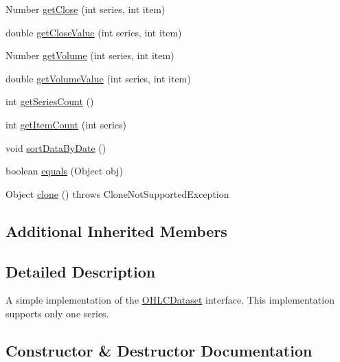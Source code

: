 \begin{DoxyCompactItemize}
\item 
Number \mbox{\hyperlink{classorg_1_1jfree_1_1data_1_1xy_1_1_default_o_h_l_c_dataset_afca93f709f3d421a3d57b67e00357b03}{get\+Close}} (int series, int item)
\item 
double \mbox{\hyperlink{classorg_1_1jfree_1_1data_1_1xy_1_1_default_o_h_l_c_dataset_ae13de67fcd68bf22dd1436d5059212e7}{get\+Close\+Value}} (int series, int item)
\item 
Number \mbox{\hyperlink{classorg_1_1jfree_1_1data_1_1xy_1_1_default_o_h_l_c_dataset_a83b83f0c9bfd31b3b26adc04760cc910}{get\+Volume}} (int series, int item)
\item 
double \mbox{\hyperlink{classorg_1_1jfree_1_1data_1_1xy_1_1_default_o_h_l_c_dataset_ab7daa41ae6b486616cc15c3b90212c15}{get\+Volume\+Value}} (int series, int item)
\item 
int \mbox{\hyperlink{classorg_1_1jfree_1_1data_1_1xy_1_1_default_o_h_l_c_dataset_af43bc16373fd6cef22a4af8f2b6aba60}{get\+Series\+Count}} ()
\item 
int \mbox{\hyperlink{classorg_1_1jfree_1_1data_1_1xy_1_1_default_o_h_l_c_dataset_ac8693287c1a19d1228b14cb9c22f52aa}{get\+Item\+Count}} (int series)
\item 
void \mbox{\hyperlink{classorg_1_1jfree_1_1data_1_1xy_1_1_default_o_h_l_c_dataset_aa3a2a174d89a61db93a432292d541f44}{sort\+Data\+By\+Date}} ()
\item 
boolean \mbox{\hyperlink{classorg_1_1jfree_1_1data_1_1xy_1_1_default_o_h_l_c_dataset_add2f8e277ddac5fb19ff0f3a49122cbc}{equals}} (Object obj)
\item 
Object \mbox{\hyperlink{classorg_1_1jfree_1_1data_1_1xy_1_1_default_o_h_l_c_dataset_a1a79c2747da3aac248beb7f74eadb60f}{clone}} ()  throws Clone\+Not\+Supported\+Exception 
\end{DoxyCompactItemize}
\subsection*{Additional Inherited Members}


\subsection{Detailed Description}
A simple implementation of the \mbox{\hyperlink{interfaceorg_1_1jfree_1_1data_1_1xy_1_1_o_h_l_c_dataset}{O\+H\+L\+C\+Dataset}} interface. This implementation supports only one series. 

\subsection{Constructor \& Destructor Documentation}
\mbox{\label{classorg_1_1jfree_1_1data_1_1xy_1_1_default_o_h_l_c_dataset_ab8737598bf279120367884c275d828a9}} 
